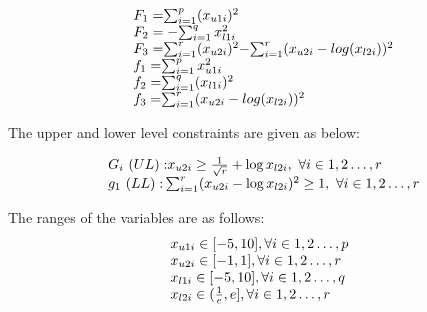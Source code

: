 \begin{equation}
\begin{array}{lr}
\text{}\hspace{2mm} F_1=$$\sum_{	i=1}^{p} (x_{u1i})^{2} $$\\
\text{}\hspace{2mm} F_2=-$$\sum_{	i=1}^{q} x_{l1i}^{2} $$\\
\text{}\hspace{2mm} F_3=$$\sum_{	i=1}^{r} (x_{u2i})^{2} $$-$$\sum_{	i=1}^{r} (x_{u2i}-log (x_{l2i}))^{2} $$\\

\text{}\hspace{2mm} f_1=$$\sum_{	i=1}^{p} x_{u1i}^{2} $$\\
\text{}\hspace{2mm} f_2=$$\sum_{	i=1}^{q} (x_{l1i})^{2} $$\\
\text{}\hspace{2mm} f_3=$$\sum_{	i=1}^{r} (x_{u2i}-log (x_{l2i}))^{2} $$\\

\end{array}
\label{smd_11}
\end{equation}


The upper and lower level constraints are given as below:

\begin{equation}
\begin{array}{lr}
\text{}\hspace{2mm} {G_i~(UL):} x_{u2i} \geq \frac{1}{\sqrt{r}}+\log x_{l2i} ,~\forall i \in {1,2\ldots,r} \\


\text{}\hspace{2mm} {g_1~(LL):} \sum_{i=1}^{r} (x_{u2i}- \log x_{l2i})^2 \geq 1,~\forall i \in {1,2\ldots,r} \\
\end{array}
\label{smd_11_con}
\end{equation}



The ranges of the variables are as follows:
\begin{equation}
\begin{array}{lr}
$$x_{u1i} \in  [-5,10],          \forall i \in {1,2\ldots,p}$$\\
$$x_{u2i} \in  [-1,1],          \forall i \in {1,2\ldots,r}$$\\
$$x_{l1i} \in  [-5,10],          \forall i \in {1,2\ldots,q}$$\\
$$x_{l2i} \in  (\frac{1}{e},e],          \forall i \in {1,2\ldots,r}$$
\end{array}
\label{smd_11_boun}
\end{equation}


